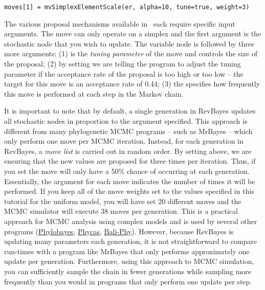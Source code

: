 {\tt\small \begin{snugshade*}
\begin{lstlisting}
moves[1] = mvSimplexElementScale(er, alpha=10, tune=true, weight=3) 
\end{lstlisting}
\end{snugshade*}}


The various proposal mechanisms available in \RevBayes~each require specific input arguments. 
The  move can only operate on a simplex and the first argument is the stochastic node that you wish to update. 
The variable node is followed by three more arguments: (1)  is the \textit{tuning parameter} of the move and controls the size of the proposal; (2) by setting  we are telling the program to adjust the tuning parameter if the acceptance rate of the proposal is too high or too low -- the target for this move is an acceptance rate of 0.44; (3) the  specifies how frequently this move is performed at each step in the Markov chain. 

It is important to note that by default, a single generation in RevBayes updates all stochastic nodes in proportion to the  argument specified. 
This approach is different from many phylogenetic MCMC programs -- such as MrBayes -- which only perform one move per MCMC iteration. 
Instead, for each generation in RevBayes, a \textit{move list} is carried out in random order. 
By setting  above, we are ensuring that the new values are proposed for  three times per iteration. 
Thus, if you set  the move will only have a 50\% chance of occurring at each generation. 
Essentially, the  argument for each move indicates the number of times it will be performed.
If you keep all of the move weights set to the values specified in this tutorial for the uniform model, you will have set 20 different moves and the MCMC simulator will execute 38 moves per generation.
This is a practical approach for MCMC analysis using complex models and is used by several other programs (\href{http://megasun.bch.umontreal.ca/People/lartillot/www/index.htm}{Phylobayes}, \href{http://hydrodictyon.eeb.uconn.edu/projects/phycas/index.php/Phycas_Home}{Phycas}, \href{http://www.bali-phy.org/}{Bali-Phy}).
However, because RevBayes is updating many parameters each generation, it is not straightforward to compare run-times with a program like MrBayes that only performs approximately one update per generation. 
Furthermore, using this approach to MCMC simulation, you can sufficiently sample the chain in fewer generations while sampling more frequently than you would in programs that only perform one update per step.

